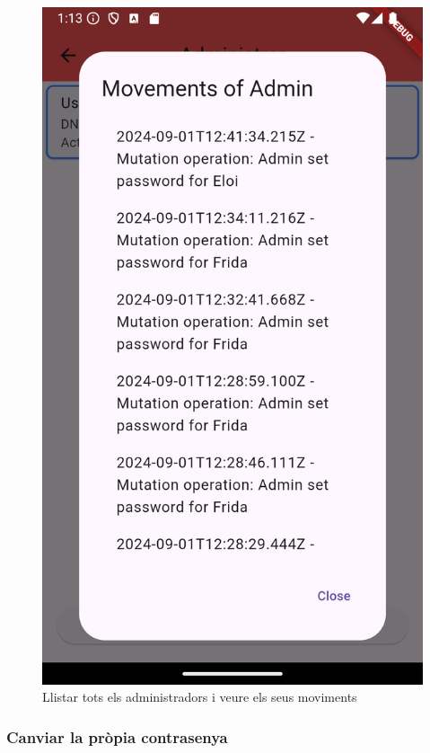 \documentclass[a4paper,12pt,twoside]{ThesisStyle}
\begin{document}
\begin{figure}[h]
\begin{minipage}{0.31\textwidth}
        \includegraphics[width=\linewidth]{imatges/showHisMovements.png}
    \end{minipage}
    
    \caption{Llistar tots els administradors i veure els seus moviments}
    \label{fig:Llistar tots els administradors i veure els seus moviments}
\end{figure}




\clearpage
\subsubsection{Canviar la pròpia contrasenya}
\label{subsubsec: Canviar la pròpia contrasenya}
\end{document}
